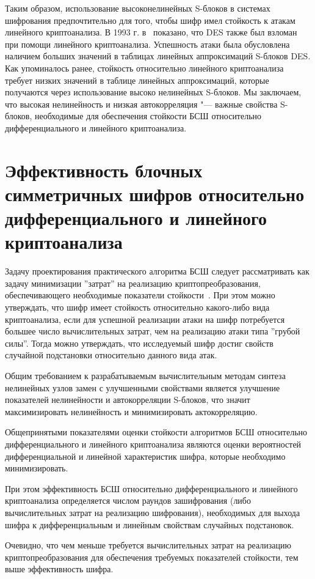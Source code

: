 Таким образом, использование высоконелинейных S-блоков в системах шифрования
предпочтительно для того, чтобы шифр имел стойкость к атакам линейного
криптоанализа. В 1993 г. в~\cite{Matsui} показано, что DES также был взломан
при помощи линейного криптоанализа. Успешность атаки была обусловлена наличием
больших значений в таблицах линейных аппроксимаций S-блоков DES. Как упоминалось
ранее, стойкость относительно линейного криптоанализа требует низких значений в
таблице линейных аппроксимаций, которые получаются через использование высоко
нелинейных S-блоков. Мы заключаем, что высокая нелинейность и низкая
автокорреляция "--- важные свойства S-блоков, необходимые для обеспечения
стойкости БСШ относительно дифференциального и линейного криптоанализа.

\section{Эффективность блочных симметричных шифров относительно
дифференциального и линейного криптоанализа}

Задачу проектирования практического алгоритма БСШ следует рассматривать как
задачу минимизации ''затрат'' на реализацию криптопреобразования,
обеспечивающего необходимые показатели стойкости~\cite{Golovashich}. При этом
можно утверждать, что шифр имеет стойкость относительно какого-либо вида
криптоанализа, если для успешной реализации атаки на шифр потребуется большее
число вычислительных затрат, чем на реализацию атаки типа ''грубой силы''.
Тогда можно утверждать, что исследуемый шифр достиг свойств случайной
подстановки относительно данного вида атак.

Общим требованием к разрабатываемым вычислительным методам синтеза нелинейных
узлов замен с улучшенными свойствами является улучшение показателей нелинейности
и автокорреляции S-блоков, что значит максимизировать нелинейность и
минимизировать актокорреляцию.

Общепринятыми показателями оценки стойкости алгоритмов БСШ относительно
дифференциального и линейного криптоанализа являются оценки вероятностей
дифференциальной и линейной характеристик шифра, которые необходимо
минимизировать.

При этом эффективность БСШ относительно дифференциального и линейного
криптоанализа определяется числом раундов зашифрования (либо вычислительных
затрат на реализацию шифрования), необходимых для выхода шифра к
дифференциальным и линейным свойствам случайных подстановок.

Очевидно, что чем меньше требуется вычислительных затрат на реализацию
криптопреобразования для обеспечения требуемых показателей стойкости, тем выше
эффективность шифра.
